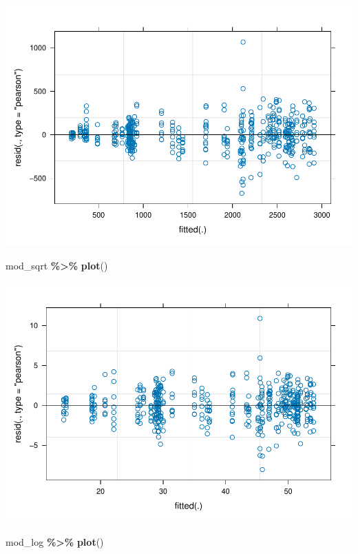 \documentclass[
]{article}
\newenvironment{Shaded}{\begin{snugshade}}{\end{snugshade}}
\newcommand{\FunctionTok}[1]{\textcolor[rgb]{0.13,0.29,0.53}{\textbf{#1}}}
\newcommand{\NormalTok}[1]{#1}
\newcommand{\SpecialCharTok}[1]{\textcolor[rgb]{0.81,0.36,0.00}{\textbf{#1}}}
\begin{document}
\includegraphics{for_markdown_files/figure-latex/unnamed-chunk-4-1.pdf}

\begin{Shaded}
\begin{Highlighting}[]
\NormalTok{mod\_sqrt }\SpecialCharTok{\%\textgreater{}\%} \FunctionTok{plot}\NormalTok{()}
\end{Highlighting}
\end{Shaded}

\includegraphics{for_markdown_files/figure-latex/unnamed-chunk-4-2.pdf}

\begin{Shaded}
\begin{Highlighting}[]
\NormalTok{mod\_log }\SpecialCharTok{\%\textgreater{}\%} \FunctionTok{plot}\NormalTok{()}
\end{Highlighting}
\end{Shaded}
\end{document}
